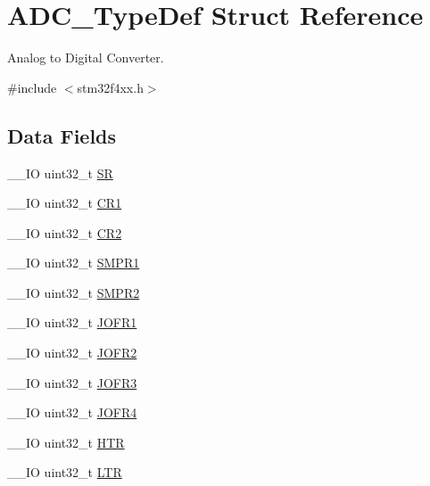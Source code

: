 \hypertarget{struct_a_d_c___type_def}{\section{A\-D\-C\-\_\-\-Type\-Def Struct Reference}
\label{struct_a_d_c___type_def}
}


Analog to Digital Converter.  




{\ttfamily \#include $<$stm32f4xx.\-h$>$}

\subsection*{Data Fields}
\begin{DoxyCompactItemize}
\item 
\-\_\-\-\_\-\-I\-O uint32\-\_\-t \hyperlink{struct_a_d_c___type_def_af6aca2bbd40c0fb6df7c3aebe224a360}{S\-R}
\item 
\-\_\-\-\_\-\-I\-O uint32\-\_\-t \hyperlink{struct_a_d_c___type_def_ab0ec7102960640751d44e92ddac994f0}{C\-R1}
\item 
\-\_\-\-\_\-\-I\-O uint32\-\_\-t \hyperlink{struct_a_d_c___type_def_afdfa307571967afb1d97943e982b6586}{C\-R2}
\item 
\-\_\-\-\_\-\-I\-O uint32\-\_\-t \hyperlink{struct_a_d_c___type_def_af9d6c604e365c7d9d7601bf4ef373498}{S\-M\-P\-R1}
\item 
\-\_\-\-\_\-\-I\-O uint32\-\_\-t \hyperlink{struct_a_d_c___type_def_a6ac83fae8377c7b7fcae50fa4211b0e8}{S\-M\-P\-R2}
\item 
\-\_\-\-\_\-\-I\-O uint32\-\_\-t \hyperlink{struct_a_d_c___type_def_a427dda1678f254bd98b1f321d7194a3b}{J\-O\-F\-R1}
\item 
\-\_\-\-\_\-\-I\-O uint32\-\_\-t \hyperlink{struct_a_d_c___type_def_a11e65074b9f06b48c17cdfa5bea9f125}{J\-O\-F\-R2}
\item 
\-\_\-\-\_\-\-I\-O uint32\-\_\-t \hyperlink{struct_a_d_c___type_def_a613f6b76d20c1a513976b920ecd7f4f8}{J\-O\-F\-R3}
\item 
\-\_\-\-\_\-\-I\-O uint32\-\_\-t \hyperlink{struct_a_d_c___type_def_a2fd59854223e38158b4138ee8e913ab3}{J\-O\-F\-R4}
\item 
\-\_\-\-\_\-\-I\-O uint32\-\_\-t \hyperlink{struct_a_d_c___type_def_a24c3512abcc90ef75cf3e9145e5dbe9b}{H\-T\-R}
\item 
\-\_\-\-\_\-\-I\-O uint32\-\_\-t \hyperlink{struct_a_d_c___type_def_a9f8712dfef7125c0bb39db11f2b7416b}{L\-T\-R}

\end{DoxyCompactItemize}
